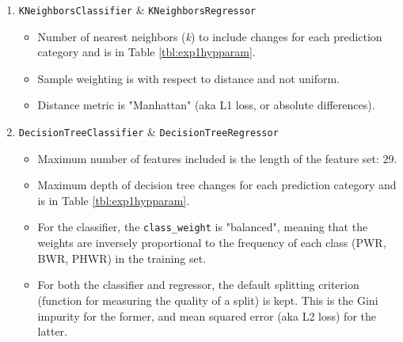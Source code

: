 \begin{enumerate}
  \item \texttt{KNeighborsClassifier} \& \texttt{KNeighborsRegressor}
    \begin{itemize}
      \item Number of nearest neighbors (\textit{k}) to include changes for 
            each prediction category and is in Table \ref{tbl:exp1hypparam}.
      \item Sample weighting is with respect to distance and not uniform.
      \item Distance metric is "Manhattan" (aka L1 loss, or absolute 
            differences).
    \end{itemize}
  \item \texttt{DecisionTreeClassifier} \& \texttt{DecisionTreeRegressor}
    \begin{itemize}
      \item Maximum number of features included is the length of the feature 
            set: 29.
      \item Maximum depth of decision tree changes for each prediction category
            and is in Table \ref{tbl:exp1hypparam}.
      \item For the classifier, the \texttt{class\_weight} is "balanced", 
            meaning that the weights are inversely proportional to the frequency
            of each class (\gls{PWR}, \gls{BWR}, \gls{PHWR}) in the training set.
      \item For both the classifier and regressor, the default splitting criterion
            (function for measuring the quality of a split) is kept. This is the 
            Gini impurity for the former, and mean squared error (aka L2 loss) 
            for the latter.
    \end{itemize}
\end{enumerate}

